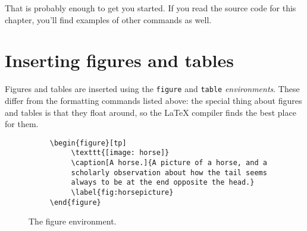 That is probably enough to get you started. If you read the source code for this chapter, you'll find examples of other commands as well.

\section{Inserting figures and tables}
\label{sec:figuresandtables}
Figures and tables are inserted using the \verb+figure+ and \verb+table+ \emph{environments}. These differ from the formatting commands listed above: the special thing about figures and tables is that they float around, so the LaTeX compiler finds the best place for them. 

\begin{figure}[tp]
\begin{verbatim}
     \begin{figure}[tp]
          \texttt{[image: horse]}
          \caption[A horse.]{A picture of a horse, and a 
          scholarly observation about how the tail seems 
          always to be at the end opposite the head.}
          \label{fig:horsepicture}
     \end{figure}
\end{verbatim}\caption{The figure environment.}
\label{fig:figure}
\end{figure}

